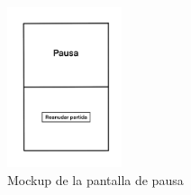   \begin{figure}[htbp]
\centering
  \includegraphics[width=0.3\textwidth]{archivos/mockup_pause.png}
  \caption{Mockup de la pantalla de pausa}
  \label{fig:mockup_pause}
\end{figure}

